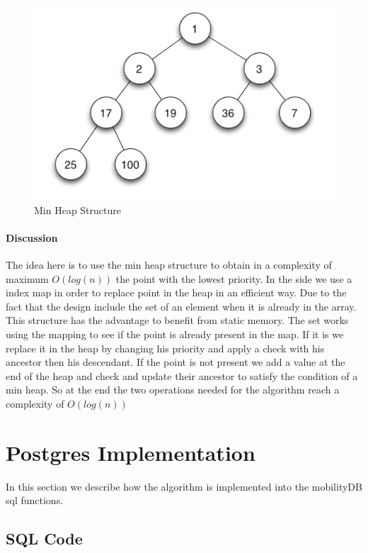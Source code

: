 \begin{figure}[!h]
\centering
\includegraphics[width=1\linewidth]{figures/tree.jpeg}
\caption{Min Heap Structure}
\label{fig:min_heap}
\end{figure}


\paragraph{Discussion}

The idea here is to use the min heap structure to obtain in a complexity of maximum $O(log(n))$  the point with the lowest priority. In the side we use a index map in order to replace point in the heap in an efficient way. Due to the fact that the design include the set of an element when it is already in the array. This structure has the advantage to benefit from static memory. The set works using the mapping to see if the point is already present in the map. If it is we replace it in the heap by changing his priority and apply a check with his ancestor then his descendant. If the point is not present we add a value at the end of the heap and check and update their ancestor to satisfy the condition of a min heap. So at the end the two operations needed for the algorithm reach a complexity of $O(log(n))$

\section{Postgres Implementation}

In this section we describe how the algorithm is implemented into the mobilityDB sql functions.
\subsection{SQL Code}

